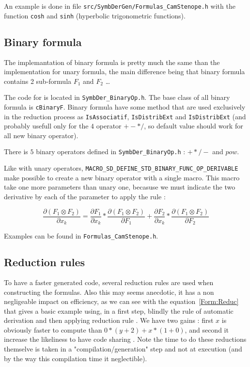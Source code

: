 An example is done in file {\tt src/SymbDerGen/Formulas\_CamStenope.h} with the function
{\tt cosh} and {\tt sinh}  (hyperbolic trigonometric functions).


\subsection{Binary formula}

The implemantation of binary formula is pretty much the same than the implementation for unary formula,
the main difference being that binary formula contains 2 sub-formula $F_1$ and $F_2$ \dots

The code for is located in {\tt SymbDer\_BinaryOp.h}.  The base class of all binary formula is
{\tt cBinaryF}.  Binary formula have some method that are used exclusively in the reduction process 
as {\tt IsAssociatif},  {\tt IsDistribExt} and {\tt IsDistribExt}  (and probably usefull only
for the $4$ operator $+-*/$, so default value should work for all new binary operator).

There is $5$ binary operators defined in  {\tt SymbDer\_BinaryOp.h} : $+*/-$ and $pow$.

Like with unary operators, {\tt MACRO\_SD\_DEFINE\_STD\_BINARY\_FUNC\_OP\_DERIVABLE}
make possible to create a new binary operator with a single macro.
This macro take one more parameters than unary one, becasuse  we must indicate the two
derivative by each of the parameter to apply the rule :

\begin{equation}
        \frac{\partial (F_1 \otimes F_2)} {\partial x_k} 
     =   \frac{\partial F_1 } {\partial x_k} * \frac{\partial (F_1 \otimes F_2)} {\partial F_1} 
       + \frac{\partial F_2 } {\partial x_k} * \frac{\partial (F_1 \otimes F_2)} {\partial F_2} 
\end{equation}

Examples can be found in {\tt Formulas\_CamStenope.h}.



\subsection{Reduction rules}

\label{Reduc:Rule}

To have a faster generated code, several reduction rules are used when 
constructing the formulas. Also this may seems anecdotic,
it has a non negligeable  impact on efficiency, as we can see with the equation~\ref{Form:Reduc}
that gives a basic example using, in a first step, blindly the 
rule of automatic derivation and then applying reduction rule .
We have two gains : first $x$ is obviously faster to compute than $0 * (y+2) + x * (1 + 0)$,
and second it increase the likeliness to have code sharing . Note the time to do
these reductions themselve is taken in a "compilation/generation" step and not at execution
(and by the way this compilation time it neglectible).

